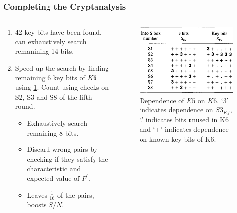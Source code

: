 \documentclass{beamer}
\begin{document}
    \begin{frame}
        \frametitle{Completing the Cryptanalysis}
        \begin{columns}
            \begin{column}{0.6\linewidth}
                \begin{enumerate}
                    \item<1-> 42 key bits have been found, can exhaustively
                    search remanining 14 bits.
                    \item<2-> Speed up the search by finding remaining 6 key
                    bits of \(K6\) using \cref{fig:des-k5}. Count using checks
                    on S2, S3 and S8 of the fifth round. 
                    \begin{itemize}
                        \item<3-> Exhaustively search remaining 8 bits.
                        \item<4-> Discard wrong pairs by checking if they
                        satisfy the characteristic and expected value of
                        \(F^\prime\).
                        \item<5-> Leaves \(\frac{1}{16}\) of the pairs, boosts
                        \(S/N\).
                    \end{itemize}
                \end{enumerate}
            \end{column}
            \begin{column}{0.4\linewidth}
                \begin{figure}[!ht]
                    \centering
                    \includegraphics[width=\columnwidth]{images/des_k5.png}
                    \caption{Dependence of \(K5\) on \(K6\). `3' indicates
                    dependence on \(S3_{Kf}\), `.' indicates bits unused in K6
                    and `+' indicates dependence on known key bits of K6.}
                    \label{fig:des-k5}
                \end{figure}
            \end{column}
        \end{columns}
    \end{frame}
\end{document}
